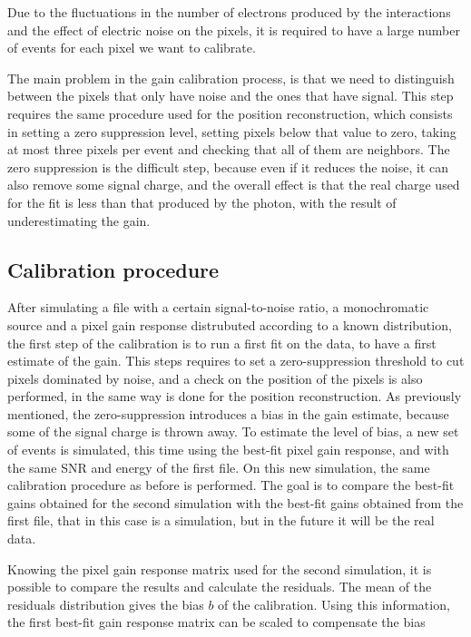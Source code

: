 Due to the fluctuations in the number of electrons produced by the interactions and the effect of electric noise on the pixels, it is required to have a large number of events for each pixel we want to calibrate.

The main problem in the gain calibration process, is that we need to distinguish between the pixels that only have noise and the ones that have signal. This step requires the same procedure used for the position reconstruction, which consists in setting a zero suppression level, setting pixels below that value to zero, taking at most three pixels per event and checking that all of them are neighbors. The zero suppression is the difficult step, because even if it reduces the noise, it can also remove some signal charge, and the overall effect is that the real charge used for the fit is less than that produced by the photon, with the result of underestimating the gain.

\subsection{Calibration procedure}
After simulating a file with a certain signal-to-noise ratio, a monochromatic source and a pixel gain response distrubuted according to a known distribution, the first step of the calibration is to run a first fit on the data, to have a first estimate of the gain. This steps requires to set a zero-suppression threshold to cut pixels dominated by noise, and a check on the position of the pixels is also performed, in the same way is done for the position reconstruction. As previously mentioned, the zero-suppression introduces a bias in the gain estimate, because some of the signal charge is thrown away. To estimate the level of bias, a new set of events is simulated, this time using the best-fit pixel gain response, and with the same SNR and energy of the first file. On this new simulation, the same calibration procedure as before is performed. The goal is to compare the best-fit gains obtained for the second simulation with the best-fit gains obtained from the first file, that in this case is a simulation, but in the future it will be the real data.

Knowing the pixel gain response matrix used for the second simulation, it is possible to compare the results and calculate the residuals. The mean of the residuals distribution gives the bias $b$ of the calibration. Using this information, the first best-fit gain response matrix can be scaled to compensate the bias

